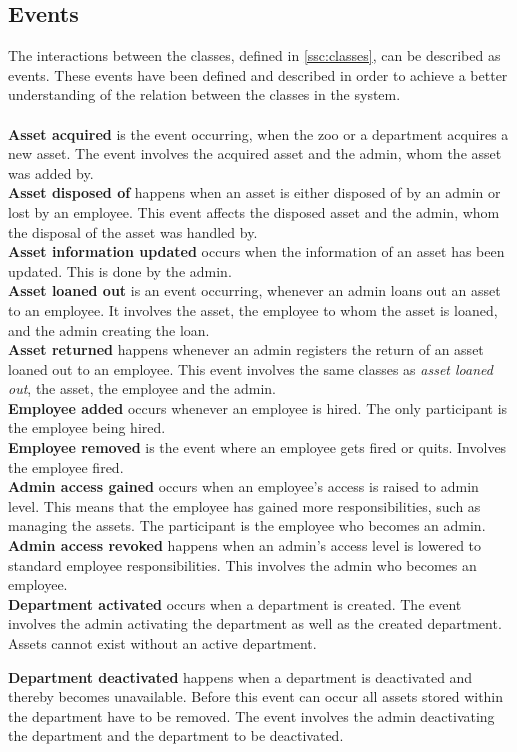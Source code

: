\subsection{Events}\label{ssc:events}
The interactions between the classes, defined in \autoref{ssc:classes}, can be described as events. These events have been defined and described in order to achieve a better understanding of the relation between the classes in the system.
\\\\
\textbf{Asset acquired} is the event occurring, when the zoo or a department acquires a new asset. The event involves the acquired asset and the admin, whom the asset was added by.\\

\textbf{Asset disposed of} happens when an asset is either disposed of by an admin or lost by an employee. This event affects the disposed asset and the admin, whom the disposal of the asset was handled by.\\

\textbf{Asset information updated} occurs when the information of an asset has been updated. This is done by the admin.\\

\textbf{Asset loaned out} is an event occurring, whenever an admin loans out an asset to an employee. It involves the asset, the employee to whom the asset is loaned, and the admin creating the loan.\\

\textbf{Asset returned} happens whenever an admin registers the return of an asset loaned out to an employee. This event involves the same classes as \textit{asset loaned out}, the asset, the employee and the admin.\\

\textbf{Employee added} occurs whenever an employee is hired. The only participant is the employee being hired.\\

\textbf{Employee removed} is the event where an employee gets fired or quits. Involves the employee fired.\\

\textbf{Admin access gained} occurs when an employee's access is raised to admin level. This means that the employee has gained more responsibilities, such as managing the assets. The participant is the employee who becomes an admin.\\

\textbf{Admin access revoked} happens when an admin's access level is lowered to standard employee responsibilities. This involves the admin who becomes an employee.\\

\textbf{Department activated} occurs when a department is created. The event involves the admin activating the department as well as the created department. Assets cannot exist without an active department.
 
\textbf{Department deactivated} happens when a department is deactivated and thereby becomes unavailable. Before this event can occur all assets stored within the department have to be removed. The event involves the admin deactivating the department and the department to be deactivated.\\